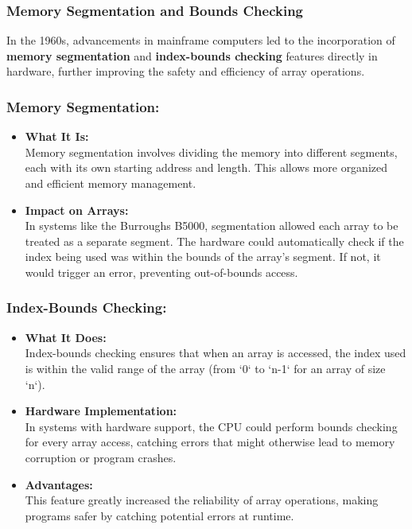 \documentclass{book}
\begin{document}
	\subsubsection{Memory Segmentation and Bounds Checking}
			In the 1960s, advancements in mainframe computers led to the incorporation of \textbf{memory segmentation} and \textbf{index-bounds checking} features directly in hardware, further improving the safety and efficiency of array operations.
	\subsubsection{Memory Segmentation:}
		\begin{itemize}
			\item \textbf{What It Is:}\\
			Memory segmentation involves dividing the memory into different segments, each with its own starting address and length. This allows more organized and efficient memory management.
			\item \textbf{Impact on Arrays:}\\
			In systems like the Burroughs B5000, segmentation allowed each array to be treated as a separate segment. The hardware could automatically check if the index being used was within the bounds of the array’s segment. If not, it would trigger an error, preventing out-of-bounds access.
		\end{itemize}
	\subsubsection{Index-Bounds Checking:}
		\begin{itemize}
			\item \textbf{What It Does:}\\
			Index-bounds checking ensures that when an array is accessed, the index used is within the valid range of the array (from `0` to `n-1` for an array of size `n`).
			\item \textbf{Hardware Implementation:}\\
			In systems with hardware support, the CPU could perform bounds checking for every array access, catching errors that might otherwise lead to memory corruption or program crashes.
			\item \textbf{Advantages:}\\
			This feature greatly increased the reliability of array operations, making programs safer by catching potential errors at runtime.
		\end{itemize}
\end{document}
